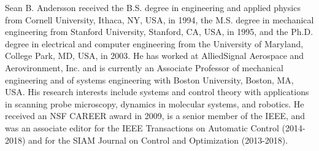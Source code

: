 \documentclass[journal]{IEEEtran}
\begin{document}
\begin{IEEEbiography}
  {Sean B. Andersson}
received the B.S. degree in engineering and applied physics from Cornell University, Ithaca, NY, USA, in 1994, the M.S. degree in mechanical engineering from Stanford University, Stanford, CA, USA, in 1995, and the Ph.D. degree in electrical and computer engineering from the University of Maryland, College Park, MD, USA, in 2003. He has worked at AlliedSignal Aerospace and Aerovironment, Inc. and is currently an Associate Professor of mechanical engineering and of systems engineering with Boston University, Boston, MA, USA. His research interests include systems and control theory with applications in scanning probe microscopy, dynamics in molecular systems, and robotics. He received an NSF CAREER award in 2009, is a senior member of the IEEE, and was an associate editor for the IEEE Transactions on Automatic Control (2014-2018) and for the SIAM Journal on Control and Optimization (2013-2018).
\end{IEEEbiography} 



\end{document}
